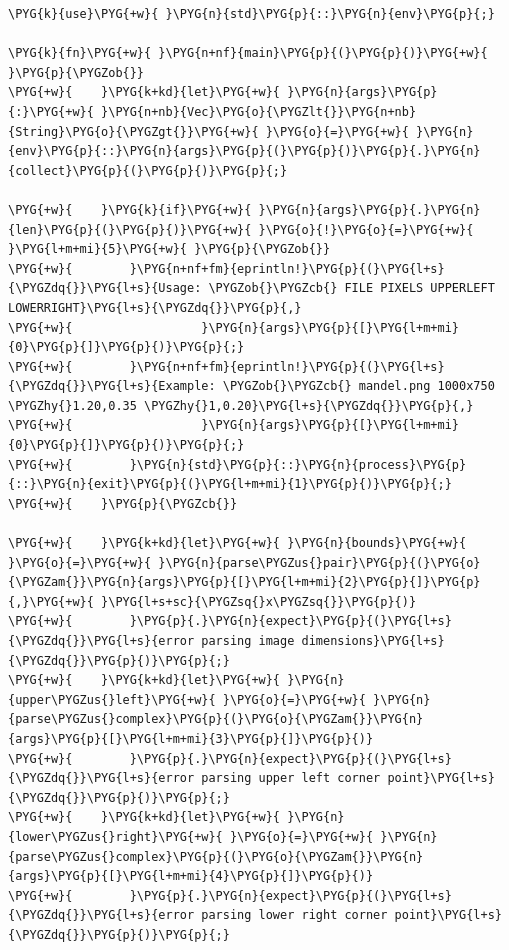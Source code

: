\begin{Verbatim}[commandchars=\\\{\},breaklines=true,breakanywhere=true,fontsize=\codefont,xleftmargin=17bp]
\PYG{k}{use}\PYG{+w}{ }\PYG{n}{std}\PYG{p}{::}\PYG{n}{env}\PYG{p}{;}

\PYG{k}{fn}\PYG{+w}{ }\PYG{n+nf}{main}\PYG{p}{(}\PYG{p}{)}\PYG{+w}{ }\PYG{p}{\PYGZob{}}
\PYG{+w}{    }\PYG{k+kd}{let}\PYG{+w}{ }\PYG{n}{args}\PYG{p}{:}\PYG{+w}{ }\PYG{n+nb}{Vec}\PYG{o}{\PYGZlt{}}\PYG{n+nb}{String}\PYG{o}{\PYGZgt{}}\PYG{+w}{ }\PYG{o}{=}\PYG{+w}{ }\PYG{n}{env}\PYG{p}{::}\PYG{n}{args}\PYG{p}{(}\PYG{p}{)}\PYG{p}{.}\PYG{n}{collect}\PYG{p}{(}\PYG{p}{)}\PYG{p}{;}

\PYG{+w}{    }\PYG{k}{if}\PYG{+w}{ }\PYG{n}{args}\PYG{p}{.}\PYG{n}{len}\PYG{p}{(}\PYG{p}{)}\PYG{+w}{ }\PYG{o}{!}\PYG{o}{=}\PYG{+w}{ }\PYG{l+m+mi}{5}\PYG{+w}{ }\PYG{p}{\PYGZob{}}
\PYG{+w}{        }\PYG{n+nf+fm}{eprintln!}\PYG{p}{(}\PYG{l+s}{\PYGZdq{}}\PYG{l+s}{Usage: \PYGZob{}\PYGZcb{} FILE PIXELS UPPERLEFT LOWERRIGHT}\PYG{l+s}{\PYGZdq{}}\PYG{p}{,}
\PYG{+w}{                  }\PYG{n}{args}\PYG{p}{[}\PYG{l+m+mi}{0}\PYG{p}{]}\PYG{p}{)}\PYG{p}{;}
\PYG{+w}{        }\PYG{n+nf+fm}{eprintln!}\PYG{p}{(}\PYG{l+s}{\PYGZdq{}}\PYG{l+s}{Example: \PYGZob{}\PYGZcb{} mandel.png 1000x750 \PYGZhy{}1.20,0.35 \PYGZhy{}1,0.20}\PYG{l+s}{\PYGZdq{}}\PYG{p}{,}
\PYG{+w}{                  }\PYG{n}{args}\PYG{p}{[}\PYG{l+m+mi}{0}\PYG{p}{]}\PYG{p}{)}\PYG{p}{;}
\PYG{+w}{        }\PYG{n}{std}\PYG{p}{::}\PYG{n}{process}\PYG{p}{::}\PYG{n}{exit}\PYG{p}{(}\PYG{l+m+mi}{1}\PYG{p}{)}\PYG{p}{;}
\PYG{+w}{    }\PYG{p}{\PYGZcb{}}

\PYG{+w}{    }\PYG{k+kd}{let}\PYG{+w}{ }\PYG{n}{bounds}\PYG{+w}{ }\PYG{o}{=}\PYG{+w}{ }\PYG{n}{parse\PYGZus{}pair}\PYG{p}{(}\PYG{o}{\PYGZam{}}\PYG{n}{args}\PYG{p}{[}\PYG{l+m+mi}{2}\PYG{p}{]}\PYG{p}{,}\PYG{+w}{ }\PYG{l+s+sc}{\PYGZsq{}x\PYGZsq{}}\PYG{p}{)}
\PYG{+w}{        }\PYG{p}{.}\PYG{n}{expect}\PYG{p}{(}\PYG{l+s}{\PYGZdq{}}\PYG{l+s}{error parsing image dimensions}\PYG{l+s}{\PYGZdq{}}\PYG{p}{)}\PYG{p}{;}
\PYG{+w}{    }\PYG{k+kd}{let}\PYG{+w}{ }\PYG{n}{upper\PYGZus{}left}\PYG{+w}{ }\PYG{o}{=}\PYG{+w}{ }\PYG{n}{parse\PYGZus{}complex}\PYG{p}{(}\PYG{o}{\PYGZam{}}\PYG{n}{args}\PYG{p}{[}\PYG{l+m+mi}{3}\PYG{p}{]}\PYG{p}{)}
\PYG{+w}{        }\PYG{p}{.}\PYG{n}{expect}\PYG{p}{(}\PYG{l+s}{\PYGZdq{}}\PYG{l+s}{error parsing upper left corner point}\PYG{l+s}{\PYGZdq{}}\PYG{p}{)}\PYG{p}{;}
\PYG{+w}{    }\PYG{k+kd}{let}\PYG{+w}{ }\PYG{n}{lower\PYGZus{}right}\PYG{+w}{ }\PYG{o}{=}\PYG{+w}{ }\PYG{n}{parse\PYGZus{}complex}\PYG{p}{(}\PYG{o}{\PYGZam{}}\PYG{n}{args}\PYG{p}{[}\PYG{l+m+mi}{4}\PYG{p}{]}\PYG{p}{)}
\PYG{+w}{        }\PYG{p}{.}\PYG{n}{expect}\PYG{p}{(}\PYG{l+s}{\PYGZdq{}}\PYG{l+s}{error parsing lower right corner point}\PYG{l+s}{\PYGZdq{}}\PYG{p}{)}\PYG{p}{;}


\end{Verbatim}
